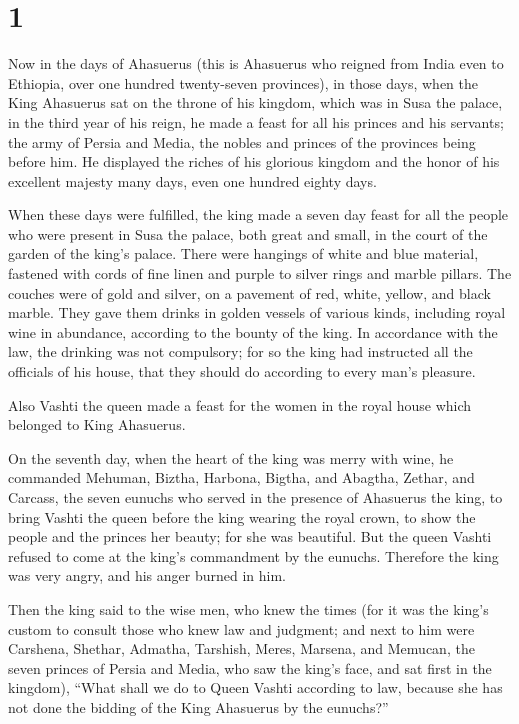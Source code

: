 \hypertarget{section}{%
\section{1}\label{section}}

 Now in the days of Ahasuerus (this is Ahasuerus who reigned
from India even to Ethiopia, over one hundred twenty-seven provinces),
 in those days, when the King Ahasuerus sat on the throne of
his kingdom, which was in Susa the palace,  in the third
year of his reign, he made a feast for all his princes and his servants;
the army of Persia and Media, the nobles and princes of the provinces
being before him.  He displayed the riches of his glorious
kingdom and the honor of his excellent majesty many days, even one
hundred eighty days.

 When these days were fulfilled, the king made a seven day
feast for all the people who were present in Susa the palace, both great
and small, in the court of the garden of the king's palace. 
There were hangings of white and blue material, fastened with cords of
fine linen and purple to silver rings and marble pillars. The couches
were of gold and silver, on a pavement of red, white, yellow, and black
marble.  They gave them drinks in golden vessels of various
kinds, including royal wine in abundance, according to the bounty of the
king.  In accordance with the law, the drinking was not
compulsory; for so the king had instructed all the officials of his
house, that they should do according to every man's pleasure.

 Also Vashti the queen made a feast for the women in the
royal house which belonged to King Ahasuerus.

 On the seventh day, when the heart of the king was merry
with wine, he commanded Mehuman, Biztha, Harbona, Bigtha, and Abagtha,
Zethar, and Carcass, the seven eunuchs who served in the presence of
Ahasuerus the king,  to bring Vashti the queen before the
king wearing the royal crown, to show the people and the princes her
beauty; for she was beautiful.  But the queen Vashti
refused to come at the king's commandment by the eunuchs. Therefore the
king was very angry, and his anger burned in him.

 Then the king said to the wise men, who knew the times
(for it was the king's custom to consult those who knew law and
judgment;  and next to him were Carshena, Shethar, Admatha,
Tarshish, Meres, Marsena, and Memucan, the seven princes of Persia and
Media, who saw the king's face, and sat first in the kingdom),
 ``What shall we do to Queen Vashti according to law,
because she has not done the bidding of the King Ahasuerus by the
eunuchs?''

